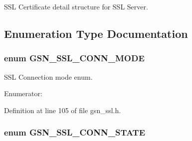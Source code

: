 SSL Certificate detail structure for SSL Server. 



\subsection{Enumeration Type Documentation}
\hypertarget{a00590_a4d55884cc33490a3514a051fccf526c0}{
\subsubsection[{GSN\_\-SSL\_\-CONN\_\-MODE}]{\setlength{\rightskip}{0pt plus 5cm}enum {\bf GSN\_\-SSL\_\-CONN\_\-MODE}}}
\label{a00590_a4d55884cc33490a3514a051fccf526c0}


SSL Connection mode enum. 

\begin{Desc}
\item[Enumerator: ]\par
\begin{description}
\item[{\em 
\hypertarget{a00590_a4d55884cc33490a3514a051fccf526c0a2a8d782da6ea42ea82fc3b4b7d4d6278}{
GSN\_\-SSL\_\-CONN\_\-MODE\_\-CLIENT}
\label{a00590_a4d55884cc33490a3514a051fccf526c0a2a8d782da6ea42ea82fc3b4b7d4d6278}
}]\item[{\em 
\hypertarget{a00590_a4d55884cc33490a3514a051fccf526c0a5e4099b5fdead4995a50799880ddad53}{
GSN\_\-SSL\_\-CONN\_\-MODE\_\-SERVER}
\label{a00590_a4d55884cc33490a3514a051fccf526c0a5e4099b5fdead4995a50799880ddad53}
}]\end{description}
\end{Desc}



Definition at line 105 of file gsn\_\-ssl.h.

\hypertarget{a00590_ae32da31c01290e41ef6e3d59ee2caf2a}{
\subsubsection[{GSN\_\-SSL\_\-CONN\_\-STATE}]{\setlength{\rightskip}{0pt plus 5cm}enum {\bf GSN\_\-SSL\_\-CONN\_\-STATE}}}
\label{a00590_ae32da31c01290e41ef6e3d59ee2caf2a}


